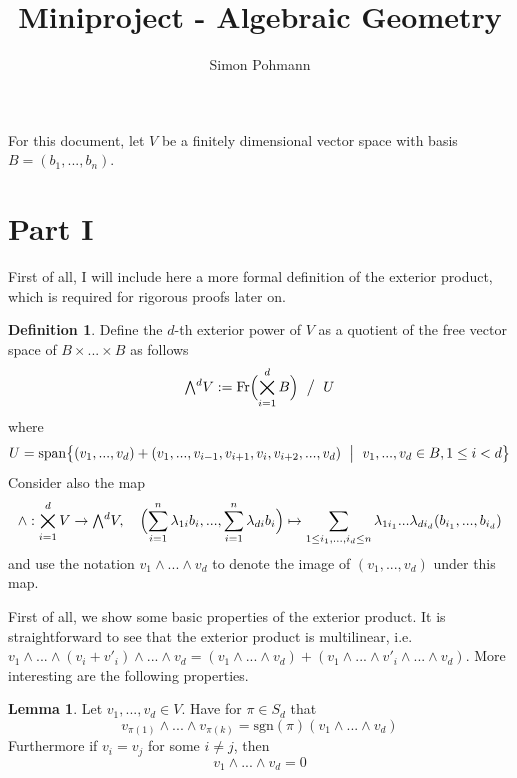 \documentclass{scrartcl}
\title{Miniproject - Algebraic Geometry}
\author{Simon Pohmann}
\date{}
\newcommand{\sgn}{\mathrm{sgn}}
\newcommand{\extpow}{\mathchoice{{\textstyle\bigwedge}}
    {{\bigwedge}}
    {{\textstyle\wedge}}
    {{\scriptstyle\wedge}}}
\newcommand{\vspan}{\mathrm{span}}
\theoremstyle{definition}
\newtheorem{definition}[subsection]{Definition}
\newtheorem{lemma}[subsection]{Lemma}
\begin{document}
\maketitle

For this document, let $V$ be a finitely dimensional vector space with basis $B = (b_1, ..., b_n)$.

\section{Part I}
First of all, I will include here a more formal definition of the exterior product, which is required for rigorous proofs later on.
\begin{definition}
    Define the $d$-th exterior power of $V$ as a quotient of the free vector space of $B \times ... \times B$ as follows
    \begin{align*}
        \extpow^d V := \mathrm{Fr}\Bigl(\bigtimes_{i = 1}^d B\Bigr) \ \bigm/ \ U
    \end{align*}
    where
    \begin{align*}
        U = \vspan \bigl\{ (v_1, ..., v_d) + (v_1, ..., v_{i - 1}, v_{i + 1}, v_i, v_{i + 2}, ..., v_d) \ \bigm| \ v_1, ..., v_d \in B, 1 \leq i < d \bigr\}
    \end{align*}
    Consider also the map
    \begin{equation*}
        \wedge: \bigtimes_{i = 1}^d V \to \extpow^d V, \quad \Bigl( \sum_{i = 1}^n \lambda_{1i} b_i, ..., \sum_{i = 1}^n \lambda_{di} b_i \Bigr) \mapsto \sum_{1 \leq i_1, ..., i_d \leq n} \lambda_{1i_1} ... \lambda_{di_d} (b_{i_1}, ..., b_{i_d})
    \end{equation*}
    and use the notation $v_1 \wedge ... \wedge v_d$ to denote the image of $(v_1, ..., v_d)$ under this map.
\end{definition}
First of all, we show some basic properties of the exterior product.
It is straightforward to see that the exterior product is multilinear, i.e. $v_1 \wedge ... \wedge (v_i + v'_i) \wedge ... \wedge v_d = (v_1 \wedge ... \wedge v_d) + (v_1 \wedge ... \wedge v'_i \wedge ... \wedge v_d)$.
More interesting are the following properties.
\begin{lemma}
    \label{prop:basic_properties_exterior_product}
    Let $v_1, ..., v_d \in V$. Have for $\pi \in S_d$ that
    \begin{equation*}
        v_{\pi(1)} \wedge ... \wedge v_{\pi(k)} = \sgn(\pi) (v_1 \wedge ... \wedge v_d)
    \end{equation*}
    Furthermore if $v_i = v_j$ for some $i \neq j$, then
    \begin{equation*}
        v_1 \wedge ... \wedge v_d = 0
    \end{equation*}
\end{lemma}
\end{document}

